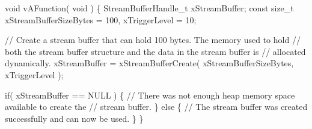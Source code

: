 \begin{DoxyPre}void vAFunction( void )
\{
StreamBufferHandle\_t xStreamBuffer;
const size\_t xStreamBufferSizeBytes = 100, xTriggerLevel = 10;\end{DoxyPre}



\begin{DoxyPre}    // Create a stream buffer that can hold 100 bytes.  The memory used to hold
    // both the stream buffer structure and the data in the stream buffer is
    // allocated dynamically.
    xStreamBuffer = xStreamBufferCreate( xStreamBufferSizeBytes, xTriggerLevel );\end{DoxyPre}



\begin{DoxyPre}    if( xStreamBuffer == NULL )
    \{
        // There was not enough heap memory space available to create the
        // stream buffer.
    \}
    else
    \{
        // The stream buffer was created successfully and can now be used.
    \}
\}
\end{DoxyPre}
 
